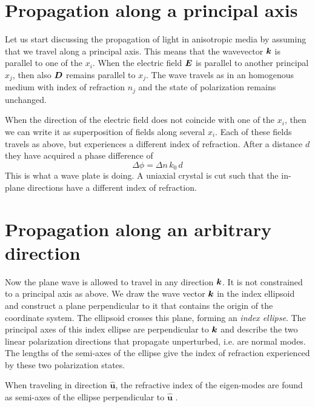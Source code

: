 \section{Propagation along a principal axis}

Let us start discussing the propagation of light in anisotropic media by assuming that we travel along a principal axis. This means that the wavevector $\boldsymbol{k}$ is parallel to one of the $x_i$. When the electric field $\boldsymbol{E}$ is parallel to another principal $x_j$, then also $\boldsymbol{D}$ remains parallel to $x_j$. The wave travels as in an homogenous medium with index of refraction $n_j$ and the state of polarization remains unchanged.

When the direction of the electric field does not coincide with one of the $x_i$, then we can write it as superposition of fields along several $x_i$. Each of these fields travels as above, but  experiences a different index of refraction. After a distance $d$ they  have acquired a phase difference of 
\begin{equation}
    \Delta \phi = \Delta n \, k_0 \, d
\end{equation}
This is what a wave plate is doing. A uniaxial crystal is cut such that the in-plane directions have a different index of refraction.


\section{Propagation along an arbitrary direction}

Now the plane wave is allowed to travel in any direction $\boldsymbol{k}$. It is not constrained to a principal axis as above. We draw the wave vector $\boldsymbol{k}$ in the index ellipsoid and construct a plane perpendicular to it that contains the origin of the coordinate system. The ellipsoid crosses this plane, forming an \emph{index ellipse}. The principal axes of this index ellipse are perpendicular to $\boldsymbol{k}$ and describe the two linear polarization directions that propagate unperturbed, i.e. are normal modes. The lengths of the semi-axes of the ellipse give the index of refraction experienced by these two polarization states.


\begin{marginfigure}
    \caption{When traveling in direction $\boldsymbol{\hat{u}}$, the refractive index of the eigen-modes are found as semi-axes of the ellipse perpendicular to $\boldsymbol{\hat{u}}$ .}
\end{marginfigure}


